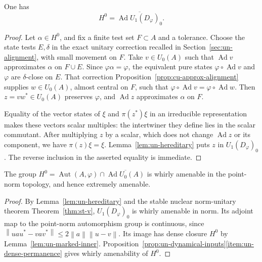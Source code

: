 \begin{lemma}\label{lem:un-marked-inner}
One has
\[
 H^0=\overline{\operatorname{Ad} U_1(D_\varphi)_0}.
\]
\end{lemma}
\begin{proof}
Let \(\alpha\in H^0\), and fix a finite test set \(F\subset A\) and a
tolerance. Choose the state tests \(E,\delta\) in the exact unitary
correction recalled in Section~\ref{sec:un-alignment}, with small movement
on \(F\). Take \(v\in U_0(A)\) such that \(\operatorname{Ad} v\) approximates
\(\alpha\) on \(F\cup E\). Since \(\varphi\alpha=\varphi\),
the equivalent pure states \(\varphi\circ\operatorname{Ad} v\) and \(\varphi\) are
\(\delta\)-close on \(E\).
That correction Proposition~\ref{prop:cu-approx-alignment} supplies
\(w\in U_0(A)\), almost central on \(F\),
such that \(\varphi\circ\operatorname{Ad} v=\varphi\circ\operatorname{Ad} w\).
Then \(z=vw^*\in U_0(A)\) preserves \(\varphi\), and \(\operatorname{Ad} z\)
approximates \(\alpha\) on \(F\).

Equality of the vector states of \(\xi\) and \(\pi(z^*)\xi\) in an
irreducible representation makes these vectors scalar multiples:
the intertwiner they define lies in the scalar commutant.
After multiplying \(z\) by a scalar, which does not change
\(\operatorname{Ad} z\) or its component, we have \(\pi(z)\xi=\xi\).
Lemma~\ref{lem:un-hereditary} puts \(z\) in \(U_1(D_\varphi)_0\).
The reverse inclusion in the asserted equality is immediate.
\end{proof}

\begin{theorem}\label{thm:un-marked-whirly}
The group \(H^0=\operatorname{Aut}(A,\varphi)\cap\overline{\operatorname{Ad} U_0(A)}\)
is whirly amenable in the point-norm topology, and hence extremely
amenable.
\end{theorem}
\begin{proof}
By Lemma~\ref{lem:un-hereditary} and the stable nuclear norm-unitary theorem
Theorem~\ref{thm:st-v},
\(U_1(D_\varphi)_0\) is whirly amenable in norm.
Its adjoint map to the point-norm automorphism group is continuous,
since
\(\left\lVert uau^*-vav^*\right\rVert\leq2\left\lVert a\right\rVert\left\lVert u-v\right\rVert\).
Its image has dense closure \(H^0\) by Lemma~\ref{lem:un-marked-inner}.
Proposition~\ref{prop:un-dynamical-inputs}\ref{item:un-dense-permanence} gives whirly amenability of
\(H^0\).
\end{proof}

